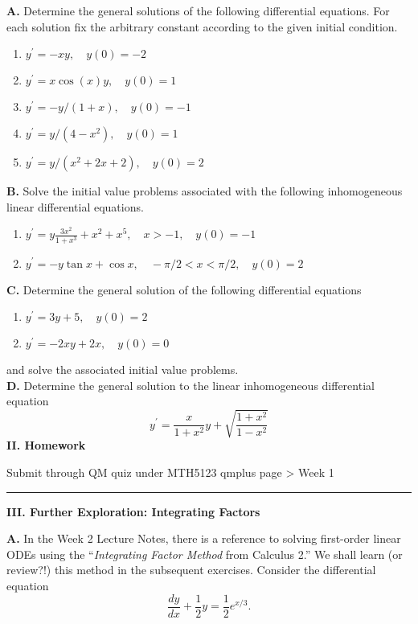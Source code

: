 \documentclass[11pt,a4paper,twoside]{article}
\begin{document}
	\textbf{A.} Determine the general solutions of the following differential equations. For each solution fix the arbitrary constant according to the given initial condition.
	\begin{enumerate}[\bfseries 1)]
		\item $y^\prime = -xy,\quad y(0) = -2$
		\item $y^\prime = x\cos(x)y,\quad y(0) = 1$
		\item $y^\prime = -y/(1+x), \quad y(0) = -1$
		\item $y^\prime = y/(4-x^2), \quad y(0) = 1$
		\item $y^\prime = y/(x^2 + 2x + 2), \quad y(0) = 2$
	\end{enumerate}
	\textbf{B.} Solve the initial value problems associated with the following inhomogeneous linear differential equations.
	\begin{enumerate}[\bfseries 1)]
		\item $y^\prime = y\frac{3x^2}{1+x^3} + x^2 + x^5,\quad x>-1,\quad y(0) = -1$
		\item $y^\prime = -y\tan x+\cos x, \quad -\pi/2 < x < \pi/2,\quad y(0) = 2$
	\end{enumerate}
	\textbf{C.} Determine the general solution of the following differential equations
	\begin{enumerate}[\bfseries 1)]
		\item $y^\prime = 3y + 5,\quad y(0) = 2$
		\item $y^\prime = -2xy + 2x, \quad y(0) = 0$
	\end{enumerate}
	and solve the associated initial value problems.\\
	\textbf{D.} Determine the general solution to the linear inhomogeneous differential equation
	$$
	y^\prime = \frac{x}{1+x^2}y+\sqrt{\frac{1+x^2}{1-x^2}}
	$$
	\textbf{II. Homework}\par
	Submit through QM quiz under MTH5123 qmplus page > Week 1\\
	\rule{\textwidth}{0.4pt}
	\newpage
	\textbf{III. Further Exploration: Integrating Factors}\par
	\textbf{A.} In the Week 2 Lecture Notes, there is a reference to solving first-order linear ODEs using the “\textit{Integrating Factor Method} from Calculus 2.” We shall learn (or review?!) this method in the subsequent exercises. Consider the differential equation
	$$
	\frac{dy}{dx} + \frac{1}{2}y = \frac{1}{2}e^{x/3}.
	$$
\end{document}
